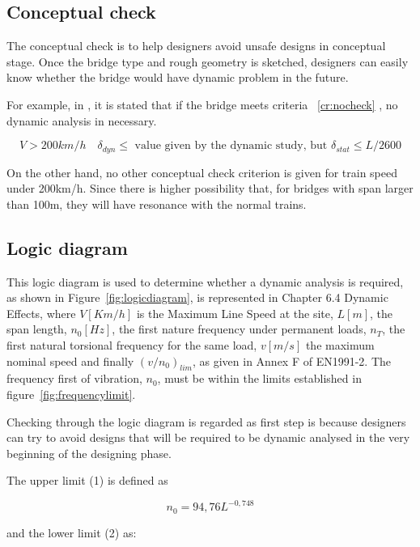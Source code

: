 \subsection{Conceptual check}
The conceptual check is to help designers avoid unsafe designs in conceptual stage. Once the bridge type and rough geometry is sketched, designers can easily know whether the bridge would have dynamic problem in the future. 

For example, in  \cite[cl.8.7.4]{calgaro2010designers}, it is stated that if the bridge meets criteria ~\ref{cr:nocheck} , no dynamic analysis in necessary. 

\begin{equation}
	\label{cr:nocheck}
	V>200km/h \quad \delta_{dyn} \leq \text{ value given by the dynamic study, but }\delta_{stat}\leq L/2600
\end{equation}

On the other hand, no other conceptual check criterion is given for train speed under 200km/h. Since there is higher possibility that, for bridges with span larger than 100m, they will have resonance with the normal trains. 

\subsection{Logic diagram}

This logic diagram is used to determine whether a dynamic analysis is required, as shown in Figure~\ref{fig:logicdiagram}, is represented in \cite{EC12} Chapter 6.4 Dynamic Effects, where $V [Km/h]$ is the Maximum Line Speed at the site, $L [m]$, the span length, $n_0 [Hz]$, the first nature frequency under permanent loads, $n_T$, the first natural torsional frequency for the same load, $v [m/s]$ the maximum nominal speed and finally $(v/n_0)_{lim}$, as given in Annex F of EN1991-2. The frequency first of vibration, $n_0$, must be within the limits established in figure~\ref{fig:frequencylimit}.

Checking through the logic diagram is regarded as first step is because designers can try to avoid designs that will be required to be dynamic analysed in the very beginning of the designing phase. 

The upper limit (1) is defined as

\begin{equation}
	n_0=94,76L^{-0,748}
\end{equation}

and the lower limit (2) as:

